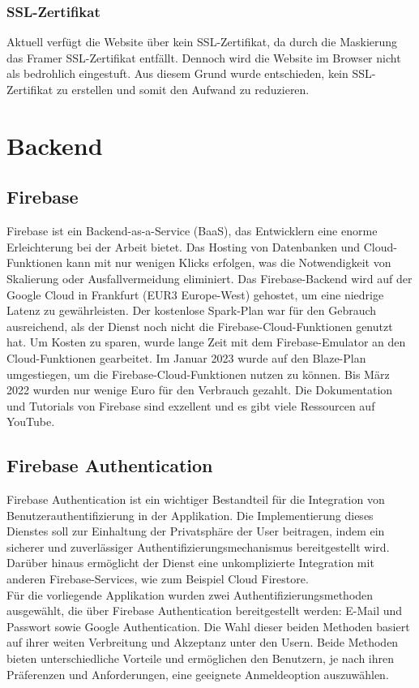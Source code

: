 \subsubsection{SSL-Zertifikat}
Aktuell verfügt die Website über kein SSL-Zertifikat, da durch die Maskierung das Framer SSL-Zertifikat entfällt. Dennoch wird die Website im Browser nicht als bedrohlich eingestuft. Aus diesem Grund wurde entschieden, kein SSL-Zertifikat zu erstellen und somit den Aufwand zu reduzieren.

\section{Backend}


\subsection{Firebase}
Firebase ist ein Backend-as-a-Service (BaaS), das Entwicklern eine enorme Erleichterung bei der Arbeit bietet. Das Hosting von Datenbanken und Cloud-Funktionen kann mit nur wenigen Klicks erfolgen, was die Notwendigkeit von Skalierung oder Ausfallvermeidung eliminiert. Das Firebase-Backend wird auf der Google Cloud in Frankfurt (EUR3 Europe-West) gehostet, um eine niedrige Latenz zu gewährleisten. Der kostenlose Spark-Plan war für den Gebrauch ausreichend, als der Dienst noch nicht die Firebase-Cloud-Funktionen genutzt hat. Um Kosten zu sparen, wurde lange Zeit mit dem Firebase-Emulator an den Cloud-Funktionen gearbeitet. Im Januar 2023 wurde auf den Blaze-Plan umgestiegen, um die Firebase-Cloud-Funktionen nutzen zu können. Bis März 2022 wurden nur wenige Euro für den Verbrauch gezahlt. Die Dokumentation und Tutorials von Firebase sind exzellent und es gibt viele Ressourcen auf YouTube.

\subsection{Firebase Authentication}

Firebase Authentication ist ein wichtiger Bestandteil für die Integration von Benutzerauthentifizierung in der Applikation. Die Implementierung dieses Dienstes soll zur Einhaltung der Privatsphäre der User beitragen, indem ein sicherer und zuverlässiger Authentifizierungsmechanismus bereitgestellt wird.
\\
Darüber hinaus ermöglicht der Dienst eine unkomplizierte Integration mit anderen Firebase-Services, wie zum Beispiel Cloud Firestore.
\\
Für die vorliegende Applikation wurden zwei Authentifizierungsmethoden ausgewählt, die über Firebase Authentication bereitgestellt werden: E-Mail und Passwort sowie Google Authentication. Die Wahl dieser beiden Methoden basiert auf ihrer weiten Verbreitung und Akzeptanz unter den Usern. Beide Methoden bieten unterschiedliche Vorteile und ermöglichen den Benutzern, je nach ihren Präferenzen und Anforderungen, eine geeignete Anmeldeoption auszuwählen.


